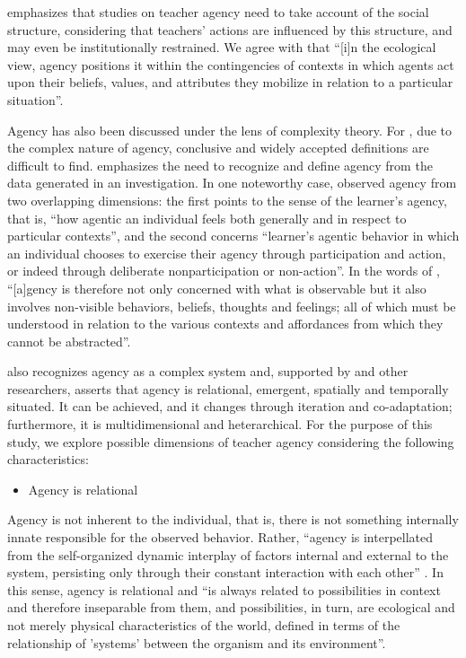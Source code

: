 \textcite{sang2020} emphasizes that studies on teacher agency need to take account of the social structure, considering that teachers' actions are influenced by this structure, and may even be institutionally restrained. We agree with \textcite[p. 2]{sang2020} that “[i]n the ecological view, agency positions it within the contingencies of contexts in which agents act upon their beliefs, values, and attributes they mobilize in relation to a particular situation”.


Agency has also been discussed under the lens of complexity theory. For \textcite{mercer2012}, due to the complex nature of agency, conclusive and widely accepted definitions are difficult to find. \textcite{mercer2012} emphasizes the need to recognize and define agency from the data generated in an investigation. In one noteworthy case, \textcite[p. 42]{mercer2011} observed agency from two overlapping dimensions: the first points to the sense of the learner's agency, that is, “how agentic an individual feels both generally and in respect to particular contexts”, and the second concerns “learner's agentic behavior in which an individual chooses to exercise their agency through participation and action, or indeed through deliberate nonparticipation or non-action”. In the words of \textcite[p. 43]{mercer2012}, “[a]gency is therefore not only concerned with what is observable but it also involves non-visible behaviors, beliefs, thoughts and feelings; all of which must be understood in relation to the various contexts and affordances from which they cannot be abstracted”.


\textcite{larsen2019} also recognizes agency as a complex system and, supported by \textcite{mercer2011, mercer2012} and other researchers, asserts that agency is relational, emergent, spatially and temporally situated. It can be achieved, and it changes through iteration and co-adaptation; furthermore, it is multidimensional and heterarchical. For the purpose of this study, we explore possible dimensions of teacher agency considering the following characteristics:


\begin{itemize}
	\item Agency is relational
\end{itemize}


Agency is not inherent to the individual, that is, there is not something internally innate responsible for the observed behavior. Rather, “agency is interpellated from the self-organized dynamic interplay of factors internal and external to the system, persisting only through their constant interaction with each other” \cite[p. 65]{larsen2019}. In this sense, agency is relational and “is always related to possibilities in context and therefore inseparable from them, and possibilities, in turn, are ecological and not merely physical characteristics of the world, defined in terms of the relationship of 'systems' between the organism and its environment”.


